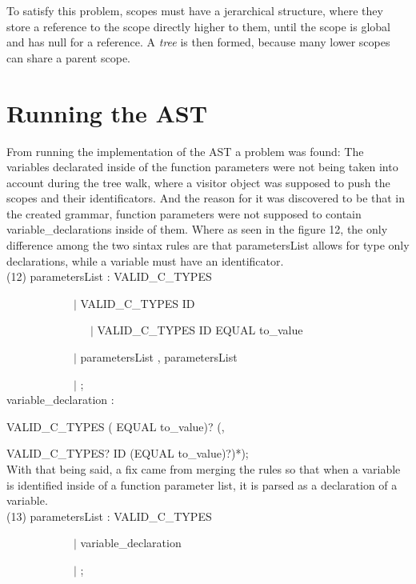 \documentclass[twocolumn,10ptr]{article}
\begin{document}
	To satisfy this problem, scopes must have a jerarchical structure, where they store a reference to the scope directly higher to them, until the scope is global and has null for a reference. A \textit{ tree} is then formed, because many lower scopes can share a parent scope.
	
	\section{ Running the AST}
	From running the implementation of the AST a problem was found: The variables declarated inside of the function parameters were not being taken into account during the tree walk, where a visitor object was supposed to push the scopes and their identificators. And the reason for it was discovered to be that in the created grammar, function parameters were not supposed to contain variable\_declarations inside of them. Where as seen in the figure 12, the only difference among the two sintax rules are that parametersList allows for type only declarations, while a variable must have an identificator.\\
	
	
	(12) parametersList : VALID\_C\_TYPES
	
	\ \ \ \ \ \ \ \ \ \ \ \      \(\mid\) VALID\_C\_TYPES ID
	
	\ \ \ \ \ \ \ \ \ \ \ \ \ \ \    \(\mid\) VALID\_C\_TYPES ID EQUAL to\_value
	
	\ \ \ \ \ \ \ \ \ \ \ \     \(\mid\) parametersList \textsc{},\textsc{}  parametersList
	
	\ \ \ \ \ \ \ \ \ \ \ \   	\(\mid\) ;\\
	
	
	variable\_declaration :  
	
	VALID\_C\_TYPES ( EQUAL to\_value)? (\textsc{},\textsc{} 
	
	VALID\_C\_TYPES? ID (EQUAL to\_value)?)*);\\
	
	With that being said, a fix came from merging the rules so that when a variable is identified inside of a function parameter list, it is parsed as a declaration of a variable.\\
	
	(13) parametersList : VALID\_C\_TYPES
	
	\ \ \ \ \ \ \ \ \ \ \ \      \(\mid\) variable\_declaration
	
	\ \ \ \ \ \ \ \ \ \ \ \   	\(\mid\) ;\\
	
\end{document}
